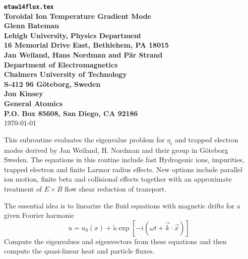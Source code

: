 
\headheight 0pt \headsep 0pt          
\topmargin 0pt  \textheight 9.0in
\oddsidemargin 0pt \textwidth 6.5in

\newcommand{\Partial}[2]{\frac{\partial #1}{\partial #2}}
\newcommand{\jacobian}{{\cal J}}



\begin{center} 
{\bf {\tt etaw14flux.tex} \\
Toroidal Ion Temperature Gradient Mode \\
\vspace{1pc}
Glenn Bateman \\
Lehigh University, Physics Department \\
16 Memorial Drive East, Bethlehem, PA 18015 \\
\vspace{1pc}
Jan Weiland, Hans Nordman and P{\"a}r Strand\\
Department of Electromagnetics \\
Chalmers University of Technology \\
S-412 96 G\"{o}teborg, Sweden \\
\vspace{1pc}
Jon Kinsey \\
General Atomics \\
P.O. Box 85608, San Diego, CA 92186} \\ 
\vspace{1pc}
\today
\end{center}
This subroutine evaluates the eigenvalue problem for $\eta_i$
and trapped electron modes derived by 
Jan Weiland, H. Nordman and their group in G\"{o}teborg Sweden.
The equations in this routine include fast Hydrogenic ions,
impurities, trapped electron and finite Larmor radius effects.
New options include parallel ion motion, finite beta and collisional effects
together with an approximate treatment of $E\times B$ flow shear reduction of 
transport.

The essential idea is to linearize the fluid equations 
with magnetic drifts for a given Fourier harmonic
\[ u = u_0(x) + \tilde{u} \exp\left[ -i (\omega t
   + \vec{k} \cdot \vec{x} ) \right] \]
Compute the eigenvalues and eigenvectors from these equations and then
compute the quasi-linear heat and particle fluxes.


